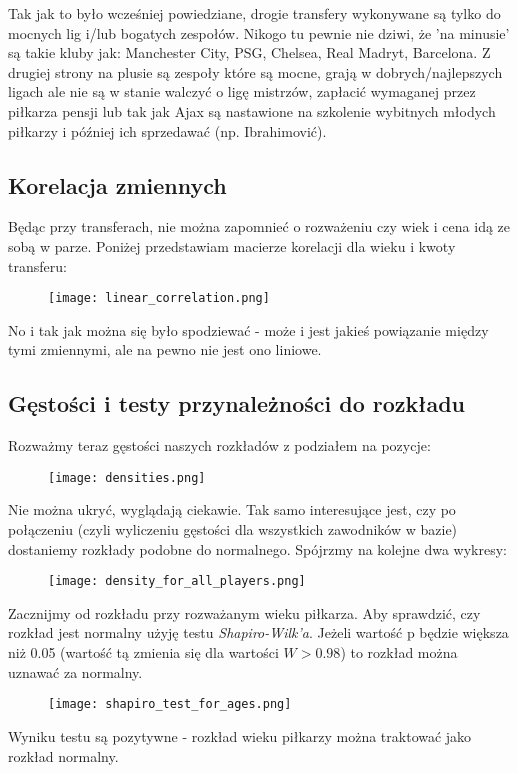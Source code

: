 \documentclass{article}
\begin{document}
Tak jak to było wcześniej powiedziane, drogie transfery wykonywane są tylko do mocnych lig i/lub bogatych zespołów. Nikogo tu pewnie nie dziwi, że 'na minusie' są takie kluby jak: Manchester City, PSG, Chelsea, Real Madryt, Barcelona. Z drugiej strony na plusie są zespoły które są mocne, grają w dobrych/najlepszych ligach ale nie są w stanie walczyć o ligę mistrzów, zapłacić wymaganej przez piłkarza pensji lub tak jak Ajax są nastawione na szkolenie wybitnych młodych piłkarzy i później ich sprzedawać (np. Ibrahimović). 

\subsection{Korelacja zmiennych}
Będąc przy transferach, nie można zapomnieć o rozważeniu czy wiek i cena idą ze sobą w parze. Poniżej przedstawiam macierze korelacji dla wieku i kwoty transferu:

\begin{figure}[H]
    \centering
    \texttt{[image: linear\_correlation.png]}
\end{figure}

No i tak jak można się było spodziewać - może i jest jakieś powiązanie między tymi zmiennymi, ale na pewno nie jest ono liniowe.

\subsection{Gęstości i testy przynależności do rozkładu}
Rozważmy teraz gęstości naszych rozkładów z podziałem na pozycje:

\begin{figure}[H]
    \centering
    \texttt{[image: densities.png]}
\end{figure}

Nie można ukryć, wyglądają ciekawie. Tak samo interesujące jest, czy po połączeniu (czyli wyliczeniu gęstości dla wszystkich zawodników w bazie) dostaniemy rozkłady podobne do normalnego. Spójrzmy na kolejne dwa wykresy:
\begin{figure}[H]
    \centering
    \texttt{[image: density\_for\_all\_players.png]}
\end{figure}

Zacznijmy od rozkładu przy rozważanym wieku piłkarza. Aby sprawdzić, czy rozkład jest normalny użyję testu \textit{Shapiro-Wilk'a}. Jeżeli wartość p będzie większa niż 0.05 (wartość tą zmienia się dla wartości $W>0.98$) to rozkład można uznawać za normalny.
\begin{figure}[H]
    \centering
    \texttt{[image: shapiro\_test\_for\_ages.png]}
\end{figure}
Wyniku testu są pozytywne - rozkład wieku piłkarzy można traktować jako rozkład normalny.
\end{document}
